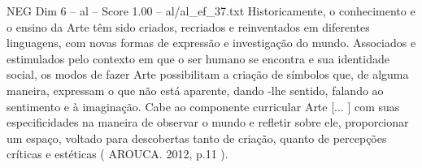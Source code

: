 \begin{textsample}{NEG Dim 6 – al – Score 1.00 – al/al\_ef\_37.txt}
Historicamente, o conhecimento e o ensino da Arte têm sido criados, recriados e reinventados em diferentes linguagens, com novas formas de expressão e investigação do mundo.
Associados e estimulados pelo contexto em que o ser humano se encontra e sua identidade social, os modos de fazer Arte possibilitam a criação de símbolos que, de alguma maneira, expressam o que não está aparente, dando -lhe sentido, falando ao sentimento e à imaginação.
Cabe ao componente curricular Arte [... ] com suas especificidades na maneira de observar o mundo e refletir sobre ele, proporcionar um espaço, voltado para descobertas tanto de criação, quanto de percepções críticas e estéticas ( AROUCA. 2012, p.11 ).

\end{textsample}
